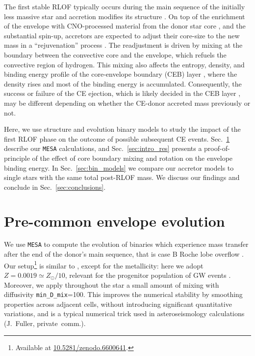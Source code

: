 \documentclass[twocolumn,twocolappendix,trackchanges]{aastex63}
\DeclareRobustCommand{\Secref}[1]{Sec.~\ref{#1}}
\begin{document}
The first stable RLOF typically occurs during the main sequence of the
initially less massive star and accretion modifies its structure
\citep[e.g.,][]{neo:1977, packet:1981, blaauw:1993, cantiello:2007,
  renzo:2021zoph}. On top of the enrichment of the envelope with
CNO-processed material from the donor star core \citep{blaauw:1993,
  renzo:2021zoph, el-badry:2022a}, and the substantial spin-up, accretors are expected
to adjust their core-size to the new mass in a ``rejuvenation''
process \citep[e.g.,][]{neo:1977, hellings:1983, hellings:1984}. The
readjustment is driven by  mixing at the boundary between the
convective core and the envelope, which refuels the convective region
of hydrogen. This mixing also affects the entropy, density, and
binding energy profile of the core-envelope boundary (CEB) layer
\citep[][]{renzo:2021zoph}, where the density rises and most of the
binding energy is accumulated. Consequently, the success or failure
of the CE ejection, which is likely decided in the CEB layer
\citep[e.g.,][]{ivanova:2013}, may be different depending on whether the CE-donor
accreted mass previously or not.

Here, we use structure and evolution binary models to study
the impact of the first RLOF phase on the outcome of possible
subsequent CE events. \Secref{sec:methods} describe our \texttt{MESA}
calculations, and \Secref{sec:intro_res} presents a proof-of-principle
of the effect of core boundary mixing and rotation on the envelope
binding energy. In \Secref{sec:bin_models} we compare our accretor
models to single stars with the same total post-RLOF mass. We discuss
our findings and conclude in
\Secref{sec:conclusions}.

\section{Pre-common envelope evolution}
\label{sec:methods}

We use \texttt{MESA}
\citep[version 15140,][]{paxton:2011, paxton:2013, paxton:2015,
  paxton:2018, paxton:2011} to compute the evolution of binaries which
experience mass transfer after the end of the donor's main sequence,
that is case B Roche lobe overflow \citep[RLOF,][]{kippenhahn:1967}.
Our setup\footnote{Available at \url{10.5281/zenodo.6600641}.} is similar to
\cite{renzo:2021zoph}, except for the
metallicity: here we adopt $Z=0.0019\simeq Z_\odot/10$, relevant for
the progenitor population of GW events \citep[e.g.,][]{vanson:2021}. Moreover, we apply
throughout the star a small amount of mixing with diffusivity
\texttt{min\_D\_mix}=100. This improves the numerical stability by
smoothing properties across adjacent cells, without introducing
significant quantitative variations, and is a typical numerical trick
used in asteroseismology calculations (J.~Fuller, private~comm.).
\end{document}

